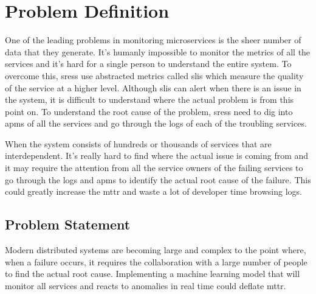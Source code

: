 \section{Problem Definition}

One of the leading problems in monitoring microservices is the sheer number of data that they generate. It's humanly impossible to monitor the metrics of all the services and it's hard for a single person to understand the entire system. To overcome this, \acp{sres} use abstracted metrics called \acp{sli} which measure the quality of the service at a higher level. Although \acp{sli} can alert when there is an issue in the system, it is difficult to understand where the actual problem is from this point on. To understand the root cause of the problem, \acp{sres} need to dig into \acp{apm} of all the services and go through the logs of each of the troubling services.

When the system consists of hundreds or thousands of services that are interdependent. It's really hard to find where the actual issue is coming from and it may require the attention from all the service owners of the failing services to go through the logs and \acp{apm} to identify the actual root cause of the failure. This could greatly increase the \ac{mttr} and waste a lot of developer time browsing logs.

\subsection{Problem Statement}

Modern distributed systems are becoming large and complex to the point where, when a failure occurs, it requires the collaboration with a large number of people to find the actual root cause.  Implementing a machine learning model that will monitor all services and reacts to anomalies in real time could deflate \ac{mttr}.